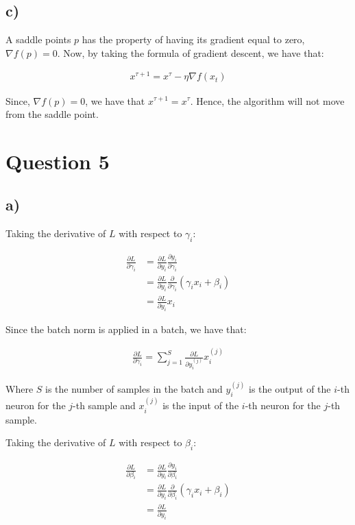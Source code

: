 \documentclass{article}
\begin{document}
\subsection*{c)}

A saddle points $p$ has the property of having its gradient equal to zero, $\nabla f(p) = 0$.
Now, by taking the formula of gradient descent, we have that:

\begin{align*}
    x^{\tau+1} = x^{\tau} - \eta  \nabla f(x_t)
\end{align*}

Since, $\nabla f(p) = 0$, we have that $x^{\tau+1} = x^{\tau}$. Hence, the algorithm will not move from the saddle point.

\section*{Question 5}

\subsection*{a)}

Taking the derivative of $L$ with respect to $\gamma_i$:

\begin{align*}
    \frac{\partial L}{\partial \gamma_i} &= \frac{\partial L}{\partial y_i} \frac{\partial y_i}{\partial \gamma_i} \\
    &= \frac{\partial L}{\partial y_i} \frac{\partial}{\partial \gamma_i} \left( \gamma_i x_i + \beta_i \right) \\
    &= \frac{\partial L}{\partial y_i} x_i
\end{align*}

Since the batch norm is applied in a batch, we have that: 

\begin{align*}
    \frac{\partial L}{\partial \gamma_i} = \sum_{j=1}^{S} \frac{\partial L}{\partial y_i^{(j)}} x_i^{(j)}
\end{align*}

Where $S$ is the number of samples in the batch and $y_i^{(j)}$ is the output of the $i$-th neuron for the $j$-th sample
and $x_i^{(j)}$ is the input of the $i$-th neuron for the $j$-th sample.

Taking the derivative of $L$ with respect to $\beta_i$:

\begin{align*}
    \frac{\partial L}{\partial \beta_i} &= \frac{\partial L}{\partial y_i} \frac{\partial y_i}{\partial \beta_i} \\
    &= \frac{\partial L}{\partial y_i} \frac{\partial}{\partial \beta_i} \left( \gamma_i x_i + \beta_i \right) \\
    &= \frac{\partial L}{\partial y_i}
\end{align*}
\end{document}
